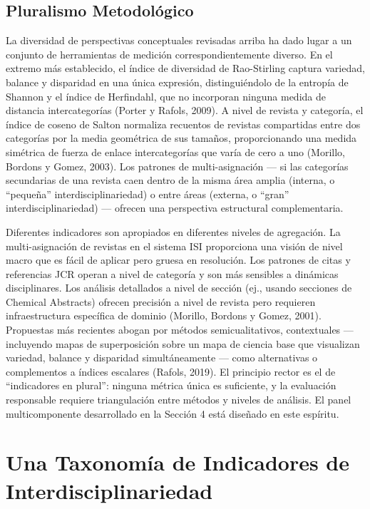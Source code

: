 \documentclass[
]{article}
\begin{document}
\hypertarget{pluralismo-metodoluxf3gico}{%
\subsection{Pluralismo Metodológico}\label{pluralismo-metodoluxf3gico}}

La diversidad de perspectivas conceptuales revisadas arriba ha dado
lugar a un conjunto de herramientas de medición correspondientemente
diverso. En el extremo más establecido, el índice de diversidad de
Rao-Stirling captura variedad, balance y disparidad en una única
expresión, distinguiéndolo de la entropía de Shannon y el índice de
Herfindahl, que no incorporan ninguna medida de distancia
intercategorías (Porter y Rafols, 2009). A nivel de revista y categoría,
el índice de coseno de Salton normaliza recuentos de revistas
compartidas entre dos categorías por la media geométrica de sus tamaños,
proporcionando una medida simétrica de fuerza de enlace intercategorías
que varía de cero a uno (Morillo, Bordons y Gomez, 2003). Los patrones
de multi-asignación --- si las categorías secundarias de una revista
caen dentro de la misma área amplia (interna, o ``pequeña''
interdisciplinariedad) o entre áreas (externa, o ``gran''
interdisciplinariedad) --- ofrecen una perspectiva estructural
complementaria.

Diferentes indicadores son apropiados en diferentes niveles de
agregación. La multi-asignación de revistas en el sistema ISI
proporciona una visión de nivel macro que es fácil de aplicar pero
gruesa en resolución. Los patrones de citas y referencias JCR operan a
nivel de categoría y son más sensibles a dinámicas disciplinares. Los
análisis detallados a nivel de sección (ej., usando secciones de
Chemical Abstracts) ofrecen precisión a nivel de revista pero requieren
infraestructura específica de dominio (Morillo, Bordons y Gomez, 2001).
Propuestas más recientes abogan por métodos semicualitativos,
contextuales --- incluyendo mapas de superposición sobre un mapa de
ciencia base que visualizan variedad, balance y disparidad
simultáneamente --- como alternativas o complementos a índices escalares
(Rafols, 2019). El principio rector es el de ``indicadores en plural'':
ninguna métrica única es suficiente, y la evaluación responsable
requiere triangulación entre métodos y niveles de análisis. El panel
multicomponente desarrollado en la Sección 4 está diseñado en este
espíritu.

\hypertarget{una-taxonomuxeda-de-indicadores-de-interdisciplinariedad}{%
\section{Una Taxonomía de Indicadores de
Interdisciplinariedad}\label{una-taxonomuxeda-de-indicadores-de-interdisciplinariedad}}
\end{document}
